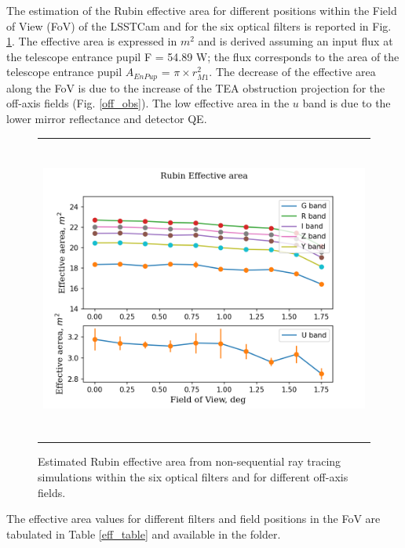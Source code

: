 \documentclass[SE,authoryear,toc]{lsstdoc}
\begin{document}
The estimation of the Rubin effective area for different positions within the Field of View (FoV) of the LSSTCam and for the six optical filters is reported in Fig. \ref{eff}. The effective area is expressed in $m^2$ and is derived assuming an input flux at the telescope entrance pupil F = 54.89 W; the flux corresponds to the area of the telescope entrance pupil $A_{EnPup}$ = $\pi\times r_{M1}^2$. The decrease of the effective area along the FoV is due to the increase of the TEA obstruction projection for the off-axis fields (Fig. \ref{off_obs}). The low effective area in the $u$ band is due to the lower mirror reflectance and detector QE.


\begin{figure}
\begin{center}
\begin{tabular}{c}
\includegraphics[height=10cm]{Rubin_effective_area_TEA_cad}
\end{tabular}
\end{center}
\caption 
{ \label{eff} Estimated Rubin effective area from non-sequential ray tracing simulations within the six optical filters and for different off-axis fields.}
\end{figure} 



The effective area values for different filters and field positions in the FoV are tabulated in Table \ref{eff_table} and available in the \cite{sitcom} folder. 
\end{document}
